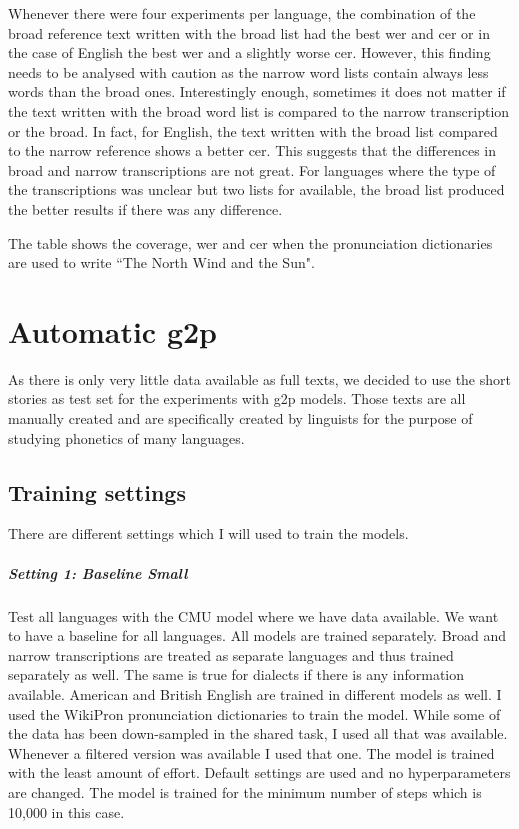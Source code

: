 Whenever there were four experiments per language, the combination of the broad reference text written with the broad list had the best \ac{wer} and \ac{cer} or in the case of English the best \ac{wer} and a slightly worse \ac{cer}. However, this finding needs to be analysed with caution as the narrow word lists contain always less words than the broad ones. Interestingly enough, sometimes it does not matter if the text written with the broad word list is compared to the narrow transcription or the broad. In fact, for English, the text written with the broad list compared to the narrow reference shows a better \ac{cer}. This suggests that the differences in broad and narrow transcriptions are not great.
For languages where the type of the transcriptions was unclear but two lists for available, the broad list produced the better results if there was any difference. 



\begin{table}[h!]
\begin{center}
\caption[Coverage of Pronunciation Dictionaries]{The table shows the coverage, \ac{wer} and \ac{cer} when the pronunciation dictionaries are used to write ``The North Wind and the Sun".}
\label{tab:coverage}
\end{center}
\end{table}

\section{Automatic \ac{g2p}}
As there is only very little data available as full texts, we decided to use the short stories as test set for the experiments with \ac{g2p} models. Those texts are all manually created and are specifically created by linguists for the purpose of studying phonetics of many languages. 

\subsection{Training settings}
There are different settings which I will used to train the models.


\subparagraph{Setting 1: Baseline Small}
Test all languages with the CMU model where we have data available. We want to have a baseline for all languages. All models are trained separately. Broad and narrow transcriptions are treated as separate languages and thus trained separately as well. The same is true for dialects if there is any information available. American and British English are trained in different models as well. I used the WikiPron pronunciation dictionaries to train the model. While some of the data has been down-sampled in the shared task, I used all that was available. Whenever a filtered version was available I used that one. The model is trained with the least amount of effort. Default settings are used and no hyperparameters are changed. The model is trained for the minimum number of steps which is 10,000 in this case. 

